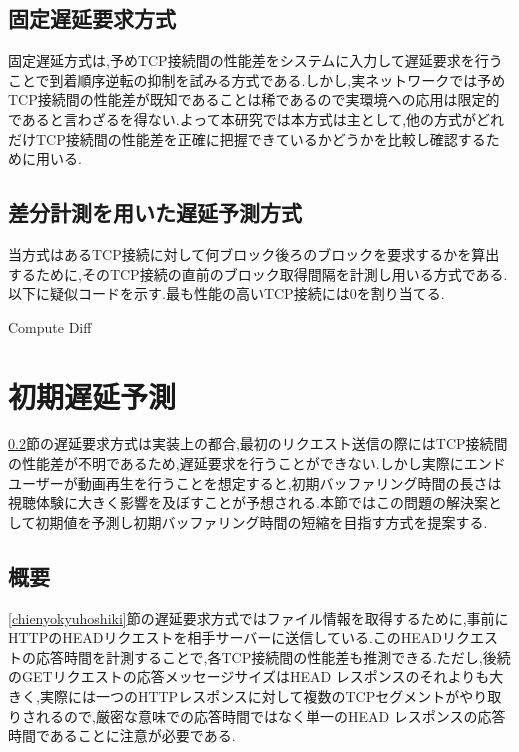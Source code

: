 \documentclass[a4j,12pt]{gradthesis_utf8}
\begin{document}
\subsection{固定遅延要求方式}
\label{kotei}
固定遅延方式は,予めTCP接続間の性能差をシステムに入力して遅延要求を行うことで到着順序逆転の抑制を試みる方式である.しかし,実ネットワークでは予めTCP接続間の性能差が既知であることは稀であるので実環境への応用は限定的であると言わざるを得ない.よって本研究では本方式は主として,他の方式がどれだけTCP接続間の性能差を正確に把握できているかどうかを比較し確認するために用いる.

\subsection{差分計測を用いた遅延予測方式}
\label{diff}
当方式はあるTCP接続に対して何ブロック後ろのブロックを要求するかを算出するために,そのTCP接続の直前のブロック取得間隔を計測し用いる方式である.以下に疑似コードを示す.最も性能の高いTCP接続には0を割り当てる.

\begin{algorithm}
	\caption{Compute Diff}
	\begin{algorithmic}[1]
		\Else 
		\EndIf
	\end{algorithmic}
	
\end{algorithm}

\section{初期遅延予測}
\label{shoki}
\ref{diff}節の遅延要求方式は実装上の都合,最初のリクエスト送信の際にはTCP接続間の性能差が不明であるため,遅延要求を行うことができない.しかし実際にエンドユーザーが動画再生を行うことを想定すると,初期バッファリング時間の長さは視聴体験に大きく影響を及ぼすことが予想される.本節ではこの問題の解決案として初期値を予測し初期バッファリング時間の短縮を目指す方式を提案する.

\subsection{概要}
\label{shokigaiyo}
\ref{chienyokyuhoshiki}節の遅延要求方式ではファイル情報を取得するために,事前にHTTPのHEADリクエストを相手サーバーに送信している.このHEADリクエストの応答時間を計測することで,各TCP接続間の性能差も推測できる.ただし,後続のGETリクエストの応答メッセージサイズはHEAD レスポンスのそれよりも大きく,実際には一つのHTTPレスポンスに対して複数のTCPセグメントがやり取りされるので,厳密な意味での応答時間ではなく単一のHEAD レスポンスの応答時間であることに注意が必要である.
\end{document}
